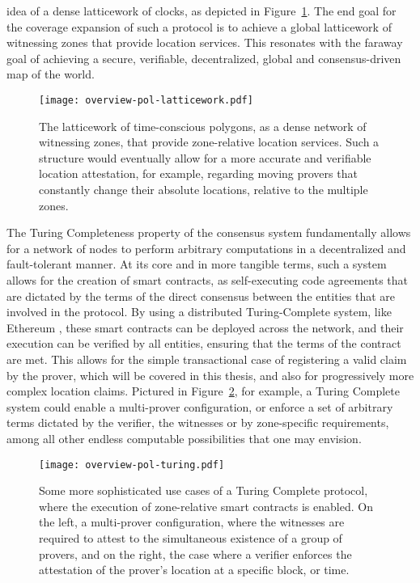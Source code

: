 idea of a dense latticework of clocks, as depicted in Figure~\ref{fig:proof-of-location-overview-latticework}. The end goal for the coverage expansion of such a \pol{} protocol is to achieve a global latticework of witnessing zones that provide location services. This resonates with the faraway goal of achieving a secure, verifiable, decentralized, global and consensus-driven map of the world.

\begin{figure}[ht]
    \begin{center}
    \texttt{[image: overview-pol-latticework.pdf]}
    \caption{The latticework of time-conscious polygons, as a dense network of witnessing zones, that provide zone-relative location services. Such a structure would eventually allow for a more accurate and verifiable location attestation, for example, regarding moving provers that constantly change their absolute locations, relative to the multiple zones.}
    \label{fig:proof-of-location-overview-latticework}
    \end{center}
\end{figure}

The Turing Completeness property of the consensus system fundamentally allows for a network of nodes to perform arbitrary computations in a decentralized and fault-tolerant manner. At its core and in more tangible terms, such a system allows for the creation of smart contracts, as self-executing code agreements that are dictated by the terms of the direct consensus between the entities that are involved in the \pol{} protocol. By using a distributed Turing-Complete system, like Ethereum \cite{buterin2014next}, these smart contracts can be deployed across the network, and their execution can be verified by all entities, ensuring that the terms of the contract are met. This allows for the simple transactional case of registering a valid \pol{} claim by the prover, which will be covered in this thesis, and also for progressively more complex location claims. Pictured in Figure~\ref{fig:proof-of-location-overview-turing}, for example, a Turing Complete system could enable a multi-prover configuration, or enforce a set of arbitrary terms dictated by the verifier, the witnesses or by zone-specific requirements, among all other endless computable possibilities that one may envision. 

\begin{figure}[ht]
    \begin{center}
    \texttt{[image: overview-pol-turing.pdf]}
    \caption{Some more sophisticated use cases of a Turing Complete \pol{} protocol, where the execution of zone-relative smart contracts is enabled. On the left, a multi-prover configuration, where the witnesses are required to attest to the simultaneous existence of a group of provers, and on the right, the case where a verifier enforces the attestation of the prover's location at a specific block, or time.}
    \label{fig:proof-of-location-overview-turing}
    \end{center}
\end{figure}

